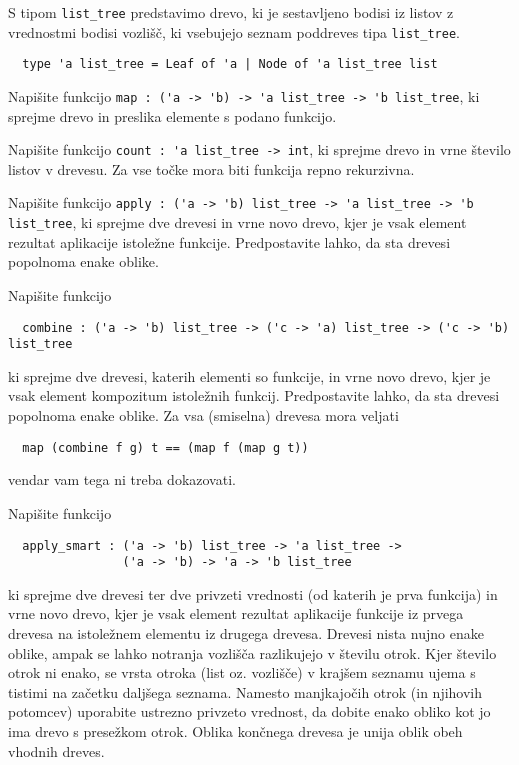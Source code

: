 \documentclass[arhiv]{../izpit}
\begin{document}

\naloga

S tipom \verb|list_tree| predstavimo drevo, ki je sestavljeno bodisi iz listov z vrednostmi bodisi vozlišč, ki vsebujejo seznam poddreves tipa \verb|list_tree|.

\begin{verbatim}
  type 'a list_tree = Leaf of 'a | Node of 'a list_tree list
\end{verbatim}

\podnaloga
Napišite funkcijo \verb|map : ('a -> 'b) -> 'a list_tree -> 'b list_tree|, ki sprejme drevo in preslika elemente s podano funkcijo. 

\podnaloga
Napišite funkcijo \verb|count : 'a list_tree -> int|, ki sprejme drevo in vrne število listov v drevesu. Za vse točke mora biti funkcija repno rekurzivna.

\podnaloga
Napišite funkcijo \verb|apply : ('a -> 'b) list_tree -> 'a list_tree -> 'b list_tree|, ki sprejme dve drevesi in vrne novo drevo, kjer je vsak element rezultat aplikacije istoležne funkcije. Predpostavite lahko, da sta drevesi popolnoma enake oblike.

\podnaloga
Napišite funkcijo
\begin{verbatim}
  combine : ('a -> 'b) list_tree -> ('c -> 'a) list_tree -> ('c -> 'b) list_tree
\end{verbatim}
ki sprejme dve drevesi, katerih elementi so funkcije, in vrne novo drevo, kjer je vsak element kompozitum istoležnih funkcij. Predpostavite lahko, da sta drevesi popolnoma enake oblike. Za vsa (smiselna) drevesa mora veljati
\begin{verbatim}
  map (combine f g) t == (map f (map g t))
\end{verbatim}
vendar vam tega ni treba dokazovati.

\podnaloga
Napišite funkcijo
\begin{verbatim}
  apply_smart : ('a -> 'b) list_tree -> 'a list_tree ->
                ('a -> 'b) -> 'a -> 'b list_tree
\end{verbatim}
ki sprejme dve drevesi ter dve privzeti vrednosti (od katerih je prva funkcija) in vrne novo drevo, kjer je vsak element rezultat aplikacije funkcije iz prvega drevesa na istoležnem elementu iz drugega drevesa. Drevesi nista nujno enake oblike, ampak se lahko notranja vozlišča razlikujejo v številu otrok. Kjer število otrok ni enako, se vrsta otroka (list oz. vozlišče) v krajšem seznamu ujema s tistimi na začetku daljšega seznama. Namesto manjkajočih otrok (in njihovih potomcev) uporabite ustrezno privzeto vrednost, da dobite enako obliko kot jo ima drevo s presežkom otrok. Oblika končnega drevesa je unija oblik obeh vhodnih dreves.
\end{document}
